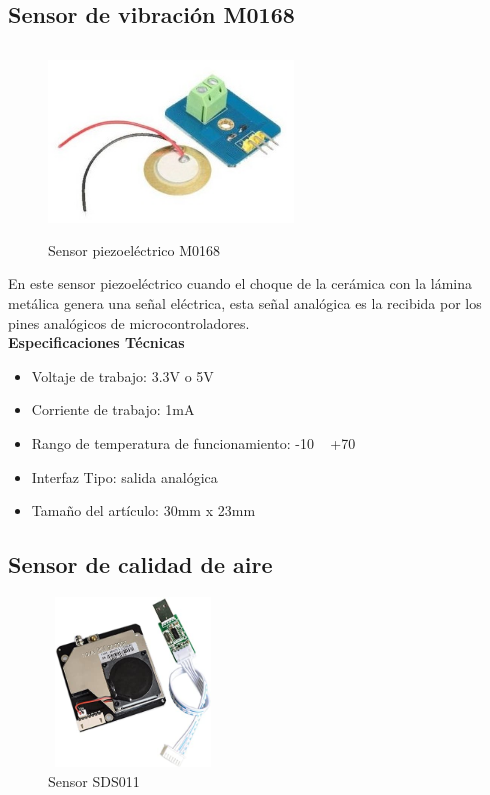 \vspace{0.5cm}

\subsection{Sensor de vibración M0168}

\begin{figure}[H]
      \centering
      \includegraphics[width=6.5cm, height=5cm]{imagenes/sensor-piezoelectrico.jpg}
      \caption{Sensor piezoeléctrico M0168}
      \label{imag:M0168}
   \end{figure}

En este sensor piezoeléctrico cuando el choque de la cerámica con la lámina metálica genera una señal eléctrica, esta señal analógica es la recibida por los pines analógicos de microcontroladores.\\

\textbf{Especificaciones Técnicas}

\begin{itemize}
    \item Voltaje de trabajo: 3.3V o 5V
    \item Corriente de trabajo: 1mA
    \item Rango de temperatura de funcionamiento: -10 ~ +70
    \item Interfaz Tipo: salida analógica
    \item Tamaño del artículo: 30mm x 23mm
\end{itemize}

\newpage

\subsection{Sensor de calidad de aire}

\vspace{1cm}

\begin{figure}[H]
      \centering
      \includegraphics[width=4.5cm, height=4.5cm]{imagenes/Sensor SDS011.jpg}
      \caption{Sensor SDS011}
      \label{imag:SDS011}
   \end{figure}

